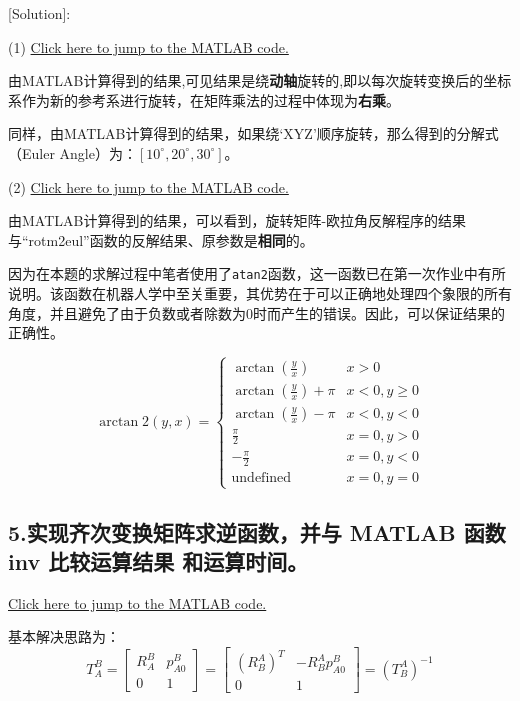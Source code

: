 \documentclass{ctexart}
\begin{document}
[Solution]:\par

(1) \href{src/Rhw_2_4_main.m}{Click here to jump to the MATLAB code.}\par

由MATLAB计算得到的结果,可见结果是绕\textbf{动轴}旋转的,即以每次旋转变换后的坐标系作为新的参考系进行旋转，在矩阵乘法的过程中体现为\textbf{右乘}。

同样，由MATLAB计算得到的结果，如果绕‘XYZ’顺序旋转，那么得到的分解式（Euler Angle）为：$[10^\circ,20^\circ,30^\circ]$。

(2) \href{src/Rhw_2_4_2_main.m}{Click here to jump to the MATLAB code.}\par

由MATLAB计算得到的结果，可以看到，旋转矩阵-欧拉角反解程序的结果与“rotm2eul”函数的反解结果、原参数是\textbf{相同}的。

因为在本题的求解过程中笔者使用了\verb|atan2|函数，这一函数已在第一次作业中有所说明。该函数在机器人学中至关重要，其优势在于可以正确地处理四个象限的所有角度，并且避免了由于负数或者除数为0时而产生的错误。因此，可以保证结果的正确性。

$$\arctan2(y,x) = \begin{cases}
	\arctan(\frac{y}{x}) & x>0 \\
	\arctan(\frac{y}{x})+\pi & x<0,y\geq 0 \\
	\arctan(\frac{y}{x})-\pi & x<0,y<0 \\
	\frac{\pi}{2} & x=0,y>0 \\
	-\frac{\pi}{2} & x=0,y<0 \\
	\text{undefined} & x=0,y=0		
\end{cases}$$															

\subsection*{5.实现齐次变换矩阵求逆函数，并与 MATLAB 函数 inv 比较运算结果 和运算时间。}

\href{src/Rhw_2_5_main.m}{Click here to jump to the MATLAB code.}\par

基本解决思路为：
$$
T^B_A = \begin{bmatrix}
	R^B_A & p^B_{A0} \\
	0 & 1
\end{bmatrix}
= \begin{bmatrix}
	(R_B^A)^T & -R_B^Ap^B_{A0} \\
	0 & 1
\end{bmatrix}
=(T_B^A)^{-1}
$$
\end{document}
